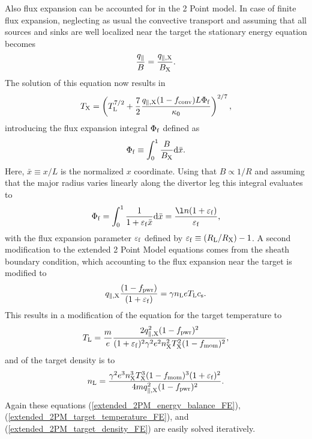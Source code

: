 \documentclass[amsmath,amssymb,a4]{revtex4}
\begin{document}
Also flux expansion can be accounted for in the 2 Point model. In case of finite flux expansion, neglecting as usual the convective transport and assuming that all sources and sinks are well localized near the target the stationary energy equation becomes
\begin{equation}
    {q_\parallel \over B} = {q_{\parallel, \rm X} \over B_{\rm X}}.
\end{equation}
The solution of this equation now results in
\begin{equation}\label{extended_2PM_energy_balance_FE}
    T_{\rm X} = \left(T_{\rm L}^{7/2} + {7 \over 2} {q_{\parallel,\rm X} (1 - f_{\rm conv}) L  \Phi_{\rm f} \over \kappa_0}\right)^{2/7},
\end{equation}
introducing the flux expansion integral $\Phi_{\rm f}$ defined as
\begin{equation}\label{FE_integral}
    \Phi_{\rm f} \equiv \int_0^1 {B\over B_{\rm X}} {\rm d}{\bar x}.
\end{equation}
Here, ${\bar x} \equiv x /L$ is the normalized $x$ coordinate. Using that $B \propto 1/R$ and assuming that the major radius varies linearly along the divertor leg this integral evaluates to
\begin{equation}\label{FE_integral}
    \Phi_{\rm f} = \int_0^1 {1 \over 1 + \varepsilon_{\rm f} {\bar x}} {\rm d}{\bar x} = {\l n( 1 + \varepsilon_{\rm f} ) \over \varepsilon_{\rm f}},
\end{equation}
with the flux expansion parameter $\varepsilon_{\rm f}$ defined by $\varepsilon_{\rm f} \equiv (R_{\rm L}/R_{\rm X}) - 1$. A second modification to the extended 2 Point Model equations comes from the sheath boundary condition, which accounting to the flux expansion near the target is modified to
\begin{equation}\label{2PM_sheath_heat_transmission_FE}
    q_{\parallel,\rm X} {(1-f_{\rm pwr}) \over (1 + \varepsilon_{\rm f})} = \gamma n_{\rm L} e T_{\rm L} c_{\rm s}.
\end{equation}
This results in a modification of the equation for the target temperature to
\begin{equation}\label{extended_2PM_target_temperature_FE}
    T_{\rm L} = {m \over e} {2 q_{\parallel,\rm X}^2 (1-f_{\rm pwr})^2 \over (1 + \varepsilon_{\rm f})^2 \gamma^2 e^2 n_{\rm X}^2 T_{\rm X}^2 (1-f_{\rm mom})^2},
\end{equation}
and of the target density is to
\begin{equation}\label{extended_2PM_target_density_FE}
    n_{\rm L} = {\gamma^2 e^3 n_{\rm X}^3 T_{\rm X}^3 (1-f_{\rm mom})^3 (1 + \varepsilon_{\rm f})^2 \over 4 m q_{\parallel,\rm X}^2 (1-f_{\rm pwr})^2}.
\end{equation}
Again these equations (\ref{extended_2PM_energy_balance_FE}), (\ref{extended_2PM_target_temperature_FE}), and (\ref{extended_2PM_target_density_FE}) are easily solved iteratively.
\end{document}
